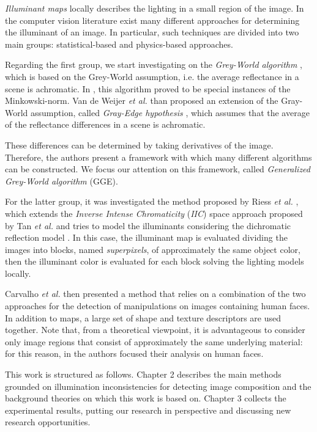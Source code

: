 \emph{Illuminant maps} locally describes the lighting in a small region of the image. In the computer vision literature exist many different approaches for determining the illuminant of an image. In particular, such techniques are divided into two main groups: statistical-based and physics-based approaches.

Regarding the first group, we start investigating on the \emph{Grey-World algorithm} \cite{Buchsbaum19801}, which is based on the Grey-World assumption, i.e. the average reflectance in a scene is achromatic. In \cite{finlayson2004shades}, this algorithm proved to be special instances of the Minkowski-norm. Van de Weijer \emph{et al.} \cite{van2007edge} than proposed an extension of the Gray-World assumption, called \emph{Gray-Edge hypothesis} \cite{van2007edge}, which assumes that the average of the reflectance differences in a scene is achromatic. 

These differences can be determined by taking derivatives of the image. Therefore, the authors present a framework with which many different algorithms can be constructed.
We focus our attention on this framework, called \emph{Generalized Grey-World algorithm} (GGE).

For the latter group, it was investigated the method proposed by Riess \emph{et al.} \cite{riess2010scene}, which extends the \emph{Inverse Intense Chromaticity} (\emph{IIC}) space approach proposed by Tan \emph{et al.} \cite{tan2004color} and tries to model the illuminants considering the dichromatic reflection model \cite{tominaga1989standard}. In this case, the illuminant map is evaluated dividing the images into blocks, named \emph{superpixels}, of approximately the same object color, then the illuminant color is evaluated for each block solving the lighting models locally. 

Carvalho \emph{et al.} \cite{carvalho2016illuminant} then presented a method that relies on a combination of the two approaches for the detection of manipulations on images containing human faces. In addition to maps, a large set of shape and texture descriptors are used together. Note that, from a theoretical viewpoint, it is advantageous to consider only image regions that consist of approximately the same underlying material: for this reason, in \cite{carvalho2016illuminant} the authors focused their analysis on human faces.

This work is structured as follows. Chapter 2 describes the main methods grounded on illumination inconsistencies for detecting image composition and the background theories on which this work is based on. Chapter 3 collects the experimental results, putting our research in perspective and discussing new research opportunities.